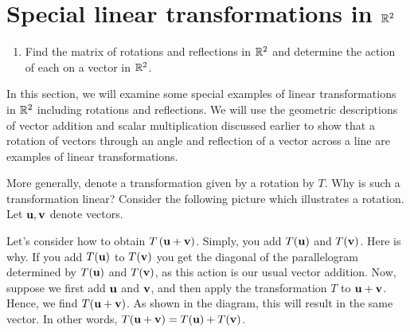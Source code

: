 \section{Special linear transformations in $\mathbb{R}^2$}

\begin{outcome}
  \begin{enumerate}
  \item Find the matrix of rotations and reflections in $\mathbb{R}^2$ and
    determine the action of each on a vector in $\mathbb{R}^2$.
  \end{enumerate}
\end{outcome}

In this section, we will examine some special examples of linear transformations in $\mathbb{R}^2$ including rotations and reflections. We will use the geometric descriptions of vector addition and scalar
multiplication discussed earlier to show that a rotation of vectors through an angle and reflection of a vector across a line are examples of
linear transformations. 

More generally, denote a transformation given by a rotation by $T$. Why is such a transformation
linear? Consider the following picture which illustrates a rotation. Let $\mbox{\bf u},\mbox{\bf v}$ denote vectors. 

\begin{center}
\end{center}

Let's consider how to obtain $T\left(\mbox{\bf u}+\mbox{\bf v}\right)$. 
Simply, you add $T (\mbox{\bf u})$ and $T(\mbox{\bf v})$. 
Here is why. If you add $T(\mbox{\bf u})$ to $T(\mbox{\bf v})$ you get
the diagonal of the parallelogram determined by $T(\mbox{\bf u})$ and $T(\mbox{\bf v})$, as this action
is our usual vector addition.
Now, suppose we first add $\mbox{\bf u}$ and $\mbox{\bf v}$, and then apply the transformation $T$ to 
$\mbox{\bf u}+\mbox{\bf v}$. Hence, we find $T( \mbox{\bf u}+\mbox{\bf v})$. 
As shown in the diagram, this will result in the same vector. In other words, $T(\mbox{\bf u}+\mbox{\bf v}) = T(\mbox{\bf u}) 
+ T(\mbox{\bf v})$. 

